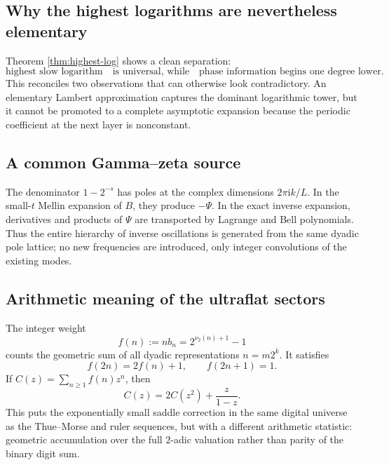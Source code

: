 \documentclass[11pt,oneside]{article}
\numberwithin{equation}{section}
\theoremstyle{definition}
\theoremstyle{remark}
\newcommand{\ii}{\mathrm i}
\newcommand{\vTwo}{\nu_2}
\begin{document}
\subsection{Why the highest logarithms are nevertheless elementary}

Theorem \ref{thm:highest-log} shows a clean separation:
\begin{equation}
 \text{highest slow logarithm}
 \quad\text{is universal, while}\quad
 \text{phase information begins one degree lower}.
 \label{eq:separation}
\end{equation}
This reconciles two observations that can otherwise look contradictory.  An
elementary Lambert approximation captures the dominant logarithmic tower, but
it cannot be promoted to a complete asymptotic expansion because the periodic
coefficient at the next layer is nonconstant.

\subsection{A common Gamma--zeta source}

The denominator $1-2^{-s}$ has poles at the complex dimensions
$2\pi\ii k/L$.  In the small-$t$ Mellin expansion of $B$, they produce
$-\Psi$.  In the exact inverse expansion, derivatives and products of $\Psi$
are transported by Lagrange and Bell polynomials.  Thus the entire hierarchy
of inverse oscillations is generated from the same dyadic pole lattice; no new
frequencies are introduced, only integer convolutions of the existing modes.

\subsection{Arithmetic meaning of the ultraflat sectors}

The integer weight
\begin{equation}
 f(n):=nb_n=2^{\vTwo(n)+1}-1
 \label{eq:f-weight}
\end{equation}
counts the geometric sum of all dyadic representations $n=m2^k$.  It satisfies
\begin{equation}
 f(2n)=2f(n)+1,
 \qquad
 f(2n+1)=1.
 \label{eq:f-recursion}
\end{equation}
If $C(z)=\sum_{n\ge1}f(n)z^n$, then
\begin{equation}
 C(z)=2C(z^2)+\frac z{1-z}.
 \label{eq:C-Mahler}
\end{equation}
This puts the exponentially small saddle correction in the same digital
universe as the Thue--Morse and ruler sequences, but with a different
arithmetic statistic: geometric accumulation over the full $2$-adic valuation
rather than parity of the binary digit sum.
\end{document}
